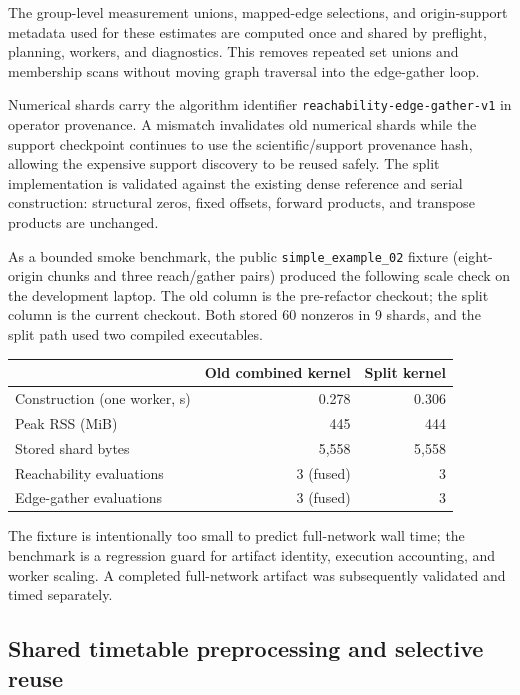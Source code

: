 The group-level measurement unions, mapped-edge selections, and origin-support
metadata used for these estimates are computed once and shared by preflight,
planning, workers, and diagnostics.  This removes repeated set unions and
membership scans without moving graph traversal into the edge-gather loop.

Numerical shards carry the algorithm identifier
\texttt{reachability-edge-gather-v1} in operator provenance.  A mismatch
invalidates old numerical shards while the support checkpoint continues to
use the scientific/support provenance hash, allowing the expensive support
discovery to be reused safely.  The split implementation is validated against
the existing dense reference and serial construction: structural zeros,
fixed offsets, forward products, and transpose products are unchanged.

As a bounded smoke benchmark, the public
\texttt{simple\_example\_02} fixture
(eight-origin chunks and three reach/gather pairs) produced the following
scale check on the development laptop.  The old column is the pre-refactor
checkout; the split column is the current checkout.  Both stored 60 nonzeros
in 9 shards, and the split path used two compiled executables.

\begin{center}
\begin{tabular}{lrr}
\hline
 & Old combined kernel & Split kernel \\
\hline
Construction (one worker, s) & 0.278 & 0.306 \\
Peak RSS (MiB) & 445 & 444 \\
Stored shard bytes & 5,558 & 5,558 \\
Reachability evaluations & 3 (fused) & 3 \\
Edge-gather evaluations & 3 (fused) & 3 \\
\hline
\end{tabular}
\end{center}

The fixture is intentionally too small to predict full-network wall time; the
benchmark is a regression guard for artifact identity, execution accounting,
and worker scaling.  A completed full-network artifact was subsequently
validated and timed separately.

\subsection{Shared timetable preprocessing and selective reuse}

